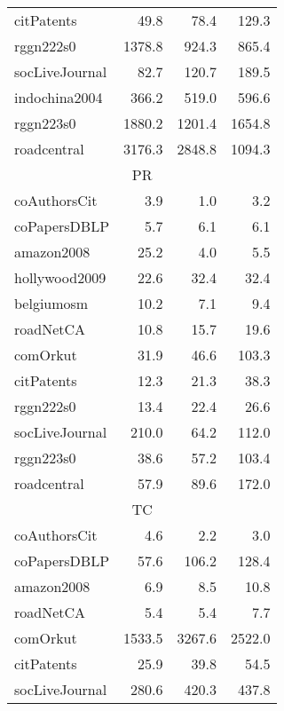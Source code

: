 \begin{table}[tbp]
\begin{center}
\begin{tabular}{|l|r|r|r|}
        \rowcolor{black!2 } citPatents&49.8&78.4&129.3\\
        \rowcolor{black!10} rggn222s0&1378.8&924.3&865.4\\
        \rowcolor{black!2 } socLiveJournal&82.7&120.7&189.5\\
        \rowcolor{black!10} indochina2004&366.2&519.0&596.6\\
        \rowcolor{black!2 } rggn223s0&1880.2&1201.4&1654.8\\
        \rowcolor{black!10} roadcentral&3176.3&2848.8&1094.3\\
        \hline
        \hline
        \multicolumn{4}{|c|}{PR} \\
        \hline
        \rowcolor{black!10} coAuthorsCit&3.9&1.0&3.2\\
        \rowcolor{black!2 } coPapersDBLP&5.7&6.1&6.1\\
        \rowcolor{black!10} amazon2008&25.2&4.0&5.5\\
        \rowcolor{black!2 } hollywood2009&22.6&32.4&32.4\\
        \rowcolor{black!10} belgiumosm&10.2&7.1&9.4\\
        \rowcolor{black!2 } roadNetCA&10.8&15.7&19.6\\
        \rowcolor{black!10} comOrkut&31.9&46.6&103.3\\
        \rowcolor{black!2 } citPatents&12.3&21.3&38.3\\
        \rowcolor{black!10} rggn222s0&13.4&22.4&26.6\\
        \rowcolor{black!2 } socLiveJournal&210.0&64.2&112.0\\
        \rowcolor{black!10} rggn223s0&38.6&57.2&103.4\\
        \rowcolor{black!2 } roadcentral&57.9&89.6&172.0\\
        \hline
        \hline
        \multicolumn{4}{|c|}{TC} \\
        \hline
        \rowcolor{black!10} coAuthorsCit&4.6&2.2&3.0\\
        \rowcolor{black!2 } coPapersDBLP&57.6&106.2&128.4\\
        \rowcolor{black!10} amazon2008&6.9&8.5&10.8\\
        \rowcolor{black!2 } roadNetCA&5.4&5.4&7.7\\
        \rowcolor{black!10} comOrkut&1533.5&3267.6&2522.0\\
        \rowcolor{black!2 } citPatents&25.9&39.8&54.5\\
        \rowcolor{black!10} socLiveJournal&280.6&420.3&437.8\\

\end{tabular}
\end{center}
\end{table}
